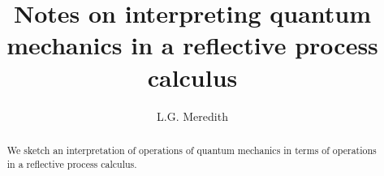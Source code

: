 \def\lastname{Meredith}

\title{Notes on interpreting quantum mechanics in a reflective process calculus}

\author{ L.G. Meredith }

\maketitle              %


\begin{abstract}

  We sketch an interpretation of operations of quantum mechanics in
  terms of operations in a reflective process calculus.

\end{abstract}




